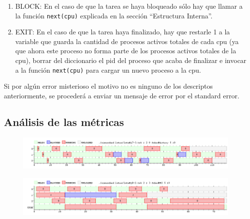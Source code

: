 \begin{itemize}
\begin{enumerate}
		\item BLOCK: En el caso de que la tarea se haya bloqueado s\'olo hay que llamar a la funci\'on \texttt{next(cpu)} explicada en la secci\'on ``Estructura Interna''.
		\item EXIT: En el caso de que la tarea haya finalizado, hay que restarle 1 a la variable que guarda la cantidad de procesos activos totales de cada cpu (ya que ahora este proceso no forma parte de los procesos activos totales de la cpu), borrar del diccionario el pid del proceso que acaba de finalizar e invocar a la funci\'on \texttt{next(cpu)} para cargar un nuevo proceso a la cpu.
	\end{enumerate}
	Si por alg\'un error misterioso el motivo no es ninguno de los descriptos anteriormente, se proceder\'a a enviar un mensaje de error por el standard error.
\end{itemize}

\subsection{An\'alisis de las m\'etricas}









\begin{figure}[H]
  \centering
  \includegraphics[width=1\textwidth]{img/imgEj7-3}
  \caption{}
  \label{fig:ej7-3}
\end{figure}


\begin{figure}[H]
  \centering
  \includegraphics[width=1\textwidth]{img/imgEj8-2}
  \caption{}
  \label{fig:ej8-1}
\end{figure}



